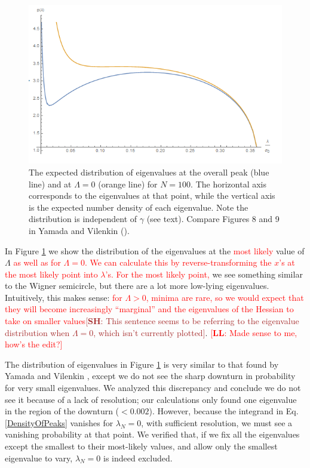 \documentclass[12pt]{article}
\newcommand{\lfl}[1]{\textcolor{red}{[{\bf LL}: #1]}}
\newcommand{\SH}[1]{\textcolor{brown}{[{\bf SH}: #1]}}
\newcommand{\LFL}[1]{\textcolor{red}{#1}}
\begin{document}

\begin{figure} 
  \centering
  \includegraphics[width=.9\linewidth]{eigendist.png}
  \caption{The expected distribution of eigenvalues at the overall peak (blue line) and at $\Lambda=0$ (orange line) for $N=100$. The horizontal axis corresponds to the eigenvalues at that point, while the vertical axis is the expected number density of each eigenvalue. Note the distribution is independent of $\gamma$ (see text). Compare Figures 8 and 9 in Yamada and Vilenkin (\cite{Yamada2018}).}
  \label{eigendist}
\end{figure}

In Figure \ref{eigendist} we show the distribution of the eigenvalues at the \LFL{most likely} value of $\Lambda$ \LFL{as well as for $\Lambda = 0$. We can calculate this by reverse-transforming the $x$'s at the most likely point into $\lambda$'s. For the most likely point,} we see something similar to the Wigner semicircle, but there are a lot more low-lying eigenvalues. Intuitively, this makes sense: \LFL{for $\Lambda > 0$, minima are rare, so we would expect that they will become increasingly ``marginal'' and the eigenvalues of the Hessian to take on smaller values}\SH{This sentence seems to be referring to the eigenvalue distribution when $\Lambda=0$, which isn't currently plotted}. \lfl{Made sense to me, how's the edit?}

The distribution of eigenvalues in Figure \ref{eigendist} is very similar to that found by Yamada and Vilenkin \cite{Yamada2018}, except we do not see the sharp downturn in probability for very small eigenvalues. We analyzed this discrepancy and conclude we do not see it because of a lack of resolution; our calculations only found one eigenvalue in the region of the downturn ($< 0.002$). However, because the integrand in Eq. \ref{DensityOfPeaks} vanishes for $\lambda_N=0$, with sufficient resolution, we must see a vanishing probability at that point. We verified that, if we fix all the eigenvalues except the smallest to their most-likely values, and allow only the smallest eigenvalue to vary, $\lambda_N=0$ is indeed excluded.
\end{document}
